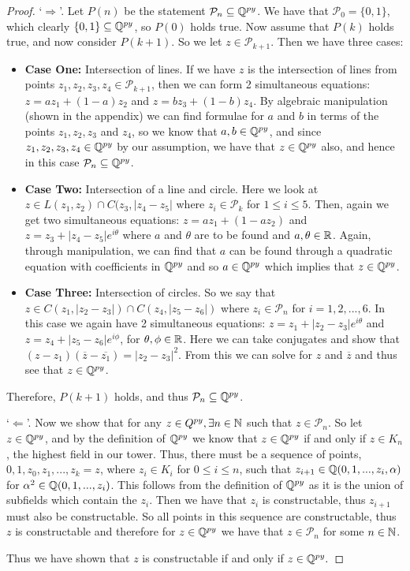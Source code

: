 \begin{proof}
    `$\Longrightarrow$'. Let $P(n)$ be the statement $\mathcal{P}_n \subseteq \mathbb Q^{py}$.
     We have that $\mathcal{P}_0 = \{0,1\}$, which clearly $\{0,1\}\subseteq\mathbb Q^{py}$, so $P(0)$ holds true.
    Now assume that $P(k)$ holds true, and now consider $P(k+1)$. So we let $z \in \mathcal{P}_{k+1}$. Then we have three cases:
    \begin{itemize}
        \item \textbf{Case One:} Intersection of lines. If we have $z$ is the intersection of lines from points $z_1, z_2, z_3, z_4 \in \mathcal{P}_{k+1}$, then we can form 2 simultaneous equations:
        $z = az_1+(1-a)z_2$ and $z = bz_3+(1-b)z_4$. By algebraic manipulation (shown in the appendix) we can find formulae for $a$ and $b$ in terms of the points $z_1,z_2,z_3$ and $z_4$, so we know that $a,b \in \mathbb Q^{py}$, and since $z_1,z_2,z_3,z_4\in \mathbb Q^{py}$ by our assumption, we have that $z\in \mathbb Q^{py}$ also, and hence in this case $\mathcal{P}_n \subseteq \mathbb Q^{py}$.
        \item \textbf{Case Two:} Intersection of a line and circle. Here we look at $z \in L(z_1,z_2)\cap C(z_3,|z_4-z_5|$ where $z_i \in \mathcal{P}_k$ for $1\leq i \leq 5$. Then, again we get two simultaneous equations:
        $z=az_1+(1-az_2)$ and $z=z_3+|z_4-z_5|e^{i\theta}$ where $a$ and $\theta$ are to be found and $a,\theta \in \mathbb R$. Again, through manipulation, we can find that $a$ can be found through a quadratic equation with coefficients in $\mathbb Q^{py}$ and so $a \in \mathbb Q^{py}$ which implies that $z\in \mathbb Q^{py}$.
        \item \textbf{Case Three:} Intersection of circles. So we say that $z \in C(z_1,|z_2-z_3|) \cap C(z_4,|z_5-z_6|)$ where $z_i \in \mathcal{P}_n$ for $i = 1,2,...,6$. In this case we again have 2 simultaneous equations: $z=z_1+|z_2-z_3|e^{i\theta}$ and $z=z_4+|z_5-z_6|e^{i\phi}$, for $\theta,\phi \in \mathbb R$. Here we can take conjugates and show that $(z-z_1)(\overline{z}-\overline{z_1})=|z_2-z_3|^2$. From this we can solve for $z$ and $\overline{z}$ and thus see that $z \in \mathbb Q^{py}$.
    \end{itemize}
Therefore, $P(k+1)$ holds, and thus $\mathcal{P}_n \subseteq \mathbb Q^{py}$. 

`$\Longleftarrow$'. Now we show that for any $z \in Q^{py}, \exists n \in \mathbb N$ such that $z \in \mathcal{P}_n$.
So let $z \in \mathbb Q^{py}$, and by the definition of $\mathbb Q^{py}$ we know that  $z\in \mathbb Q^{py}$ if and only if $z \in K_n$, the highest field in our tower. Thus, there must be a sequence of points, $0,1,z_0,z_1,...,z_k=z$, where $z_i \in K_i$ for $0\leq i \leq n$, such that $z_{i+1} \in \mathbb Q(0,1,...,z_i,\alpha)$ for $\alpha^2 \in \mathbb Q(0,1,...,z_i)$. This follows from the definition of $\mathbb Q^{py}$ as it is the union of subfields which contain the $z_i$. Then we have that $z_i$ is constructable, thus $z_{i+1}$ must also be constructable. So all points in this sequence are constructable, thus $z$ is constructable and therefore for $z \in \mathbb Q^{py}$ we have that $z \in \mathcal{P}_n$ for some $n \in \mathbb N$.

Thus we have shown that $z$ is constructable if and only if $z\in \mathbb Q^{py}.$
\end{proof}



